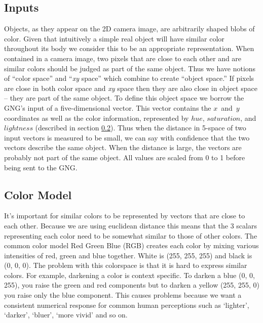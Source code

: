 \documentclass{article}
\renewcommand{\|}{\origbar} %
\newcommand{\xyspace}{{\em xy} space}
\begin{document}
\subsection{Inputs}

Objects, as they appear on the 2D camera image, are arbitrarily shaped blobs of color. Given that intuitively a simple real object will have similar color throughout its body we consider this to be an appropriate representation. When contained in a camera image, two pixels that are close to each other and are similar colors should be judged as part of the same object. Thus we have notions of ``color space'' and ``\xyspace'' which combine to create ``object space.'' If pixels are close in both color space and \xyspace{} then they are also close in object space -- they are part of the same object. To define this object space we borrow the GNG's input of a five-dimensional vector. This vector contains the $x$~and~$y$ coordinates as well as the color information, represented by $hue$, $saturation$, and $lightness$ (described in section \ref{sec:colorModel}). Thus when the distance in 5-space of two input vectors is measured to be small, we can say with confidence that the two vectors describe the same object. When the distance is large, the vectors are probably not part of the same object. All values are scaled from 0 to 1 before being sent to the GNG.

\subsection{Color Model}
\label{sec:colorModel}

It's important for similar colors to be represented by vectors that are close to each other. Because we are using euclidean distance this means that the 3 scalars representing each color need to be somewhat similar to those of other colors. The common color model Red Green Blue (RGB) creates each color by mixing various intensities of red, green and blue together. White is (255, 255, 255) and black is (0, 0, 0). The problem with this colorspace is that it is hard to express similar colors. For example, darkening a color is context specific. To darken a blue (0, 0, 255), you raise the green and red components but to darken a yellow (255, 255, 0) you raise only the blue component. This causes problems because we want a consistent numerical response for common human perceptions such as `lighter', `darker', `bluer', `more vivid' and so on.
\end{document}
